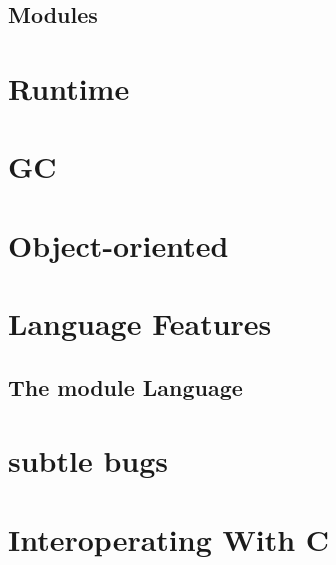 \documentclass[svgnames,12pt,a4paper]{book}
\begin{document}
  
  
  
  
  
  
  
  
  

  
  
\section{Modules}


\chapter{Runtime}
\label{sec:runtime}



\chapter{GC}
\label{sec:gc}



\chapter{Object-oriented}



\chapter{Language Features}
\label{sec:compl-lang-feat}










\section{The module Language}
\label{sec:module-language}

\chapter{subtle bugs}
\label{sec:subtle-bugs}





\chapter{Interoperating With C}
\label{sec:inter-with-c}

\end{document}
